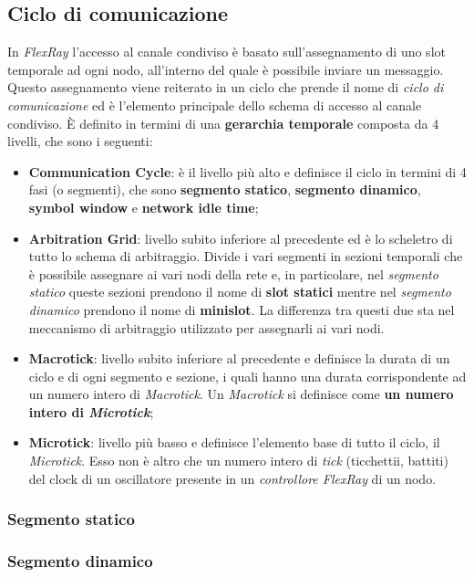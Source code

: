 \subsection{Ciclo di comunicazione}
In \emph{FlexRay} l'accesso al canale condiviso è basato sull'assegnamento di uno slot temporale ad ogni nodo, all'interno del quale è possibile inviare un messaggio. Questo assegnamento viene reiterato in un ciclo che prende il nome di \emph{ciclo di comunicazione} ed è l'elemento principale dello schema di accesso al canale condiviso. È definito in termini di una \textbf{gerarchia temporale} composta da 4 livelli, che sono i seguenti:
\begin{itemize}
    \item \textbf{Communication Cycle}: è il livello più alto e definisce il ciclo in termini di 4 fasi (o segmenti), che sono \textbf{segmento statico}, \textbf{segmento dinamico}, \textbf{symbol window} e \textbf{network idle time};
    \item \textbf{Arbitration Grid}: livello subito inferiore al precedente ed è lo scheletro di tutto lo schema di arbitraggio. Divide i vari segmenti in sezioni temporali che è possibile assegnare ai vari nodi della rete e, in particolare, nel \emph{segmento statico} queste sezioni prendono il nome di \textbf{slot statici} mentre nel \emph{segmento dinamico} prendono il nome di \textbf{minislot}. La differenza tra questi due sta nel meccanismo di arbitraggio utilizzato per assegnarli ai vari nodi. 
    \item \textbf{Macrotick}: livello subito inferiore al precedente e definisce la durata di un ciclo e di ogni segmento e sezione, i quali hanno una durata corrispondente ad un numero intero di \emph{Macrotick}. Un \emph{Macrotick} si definisce come \textbf{un numero intero di \emph{Microtick}};
    \item \textbf{Microtick}: livello più basso e definisce l'elemento base di tutto il ciclo, il \emph{Microtick}. Esso non è altro che un numero intero di \emph{tick} (ticchettii, battiti) del clock di un oscillatore presente in un \emph{controllore FlexRay} di un nodo.
\end{itemize}

\subsubsection{Segmento statico}

\subsubsection{Segmento dinamico}

